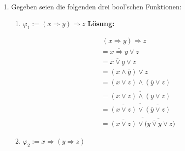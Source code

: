 \documentclass[paper=a4,fontsize=11pt]{scrartcl}%
\numberwithin{equation}{section}
\newenvironment{solution}
	{
		\color{Blue}
		\textbf{Lösung:}
	}{}
\begin{document}
\begin{enumerate}
\begin{enumerate}
\begin{solution}
		Induktionsanfang (IA): Für den Basisfall $n_2$ fallen die traditionelle und die erweiterte De Morgansche Regel zusammen. Die Aussage ist damit für den Fall $n= 2$ gültig.\\
		Induktionsvoraussetzung (IV): Für ein gewisses $n$ gelte:
		\begin{align*}
		(\overline{x_1 \land x_2 \land \ldots \land x_n}) &= \overline{x_1} \lor \ldots \overline{x_n}
		\end{align*}
		Induktionsschritt (IS):
		\begin{align*}
		(\overline{x_1 \land x_2 \land \ldots \land x_n}) &=  ((\overline{x_1 \land x_2 \land \ldots \land x_n) \land x_{n+1}})\\
		&= ((\overline{x_1 \land x_2 \land \ldots \land x_n)} \lor \overline{x_{n+1}}\\
		&= ((\overline{x_1} \lor \overline{x_2} \lor \ldots \lor \overline{x_n}) \lor  \overline{x_{n+1}}) \\
		&= \overline{x_1} \lor \overline{x_2} \lor \ldots \lor \overline{x_n}
		\end{align*}
		\end{solution}
	\end{enumerate}
	\item Gegeben seien die folgenden drei bool'schen Funktionen:
	\begin{enumerate}
		\item $\varphi_1 := (x \Rightarrow y) \Rightarrow z$
		\begin{solution}
		
		\begin{align*}
		&~ (x \Rightarrow y) \Rightarrow z\\
		&= \overline{x \Rightarrow y} \lor z\\
		&= \overline{\overline{x} \lor y} \lor z\\
		&= (x \land \overline{y}) \lor z\\
		&= (x \lor z) \land (\overline{y} \lor z)\\
		&= \overline{\overline{(x \lor z) \land (\overline{y} \lor z)}}\\
		&= \overline{\overline{(x \lor z)} \lor \overline{(\overline{y} \lor z)}} \\
		&= \overline{\overline{(x \lor z)} \lor \overline{(\overline{y \lor y} \lor z})}
		\end{align*}
		\end{solution}
		\item $\varphi_2 := x \Rightarrow (y \Rightarrow z)$
		

\end{enumerate}
\end{enumerate}
\end{document}
